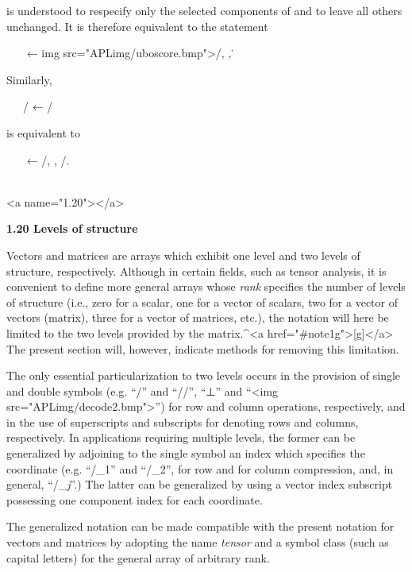 \par is understood to respecify only the selected components of  and to leave all others unchanged. It is therefore equivalent to the statement

\par \ \ \  ← \<img src="APLimg/uboscore.bmp">/, , \.

\par Similarly,

\par \ \ \ / ← 
/

\par is equivalent to

\par \ \ \  ← /, , /.
\\\ 



<a name="1.20"></a>
\par \textbf{1.20 Levels of structure}

\par Vectors and matrices are arrays which exhibit one level and two levels of structure, respectively. Although in certain fields, such as tensor analysis, it is convenient to define more general arrays whose \textit{rank} specifies the number of levels of structure (i.e., zero for a scalar, one for a vector of scalars, two for a vector of vectors (matrix), three for a vector of matrices, etc.), the notation will here be limited to the two levels provided by the matrix.^{<a href="#note1g">[g]</a>} The present section will, however, indicate methods for removing this limitation.

\par The only essential particularization to two levels occurs in the provision of single and double symbols (e.g. ``/'' and ``//'', ``⊥'' and ``<img src="APLimg/decode2.bmp">'') for row and column operations, respectively, and in the use of superscripts and subscripts for denoting rows and columns, respectively. In applications requiring multiple levels, the former can be generalized by adjoining to the single symbol an index which specifies the coordinate (e.g. ``/_{1}'' and ``/_{2}'', for row and for column compression, and, in general, ``/_{\textit{j}}''.) The latter can be generalized by using a vector index subscript possessing one component index for each coordinate.

\par The generalized notation can be made compatible with the present notation for vectors and matrices by adopting the name
\textit{tensor} and a symbol class (such as capital letters) for the general array of arbitrary rank.
\\\ 



